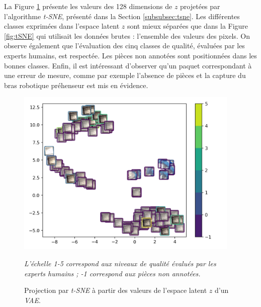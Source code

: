 La Figure \ref{fig:tSNE_ae} présente les valeurs des 128 dimensions de $z$ projetées par l'algorithme \textit{t-SNE}, présenté dans la Section \ref{subsubsec:tsne}.
Les différentes classes exprimées dans l'espace latent $z$ sont mieux séparées que dans la Figure \ref{fig:tSNE} qui utilisait les données brutes : l'ensemble des valeurs des pixels.
On observe également que l'évaluation des cinq classes de qualité, évaluées par les experts humains, est respectée.
Les pièces non annotées sont positionnées dans les bonnes classes.
Enfin, il est intéressant d'observer qu'un paquet correspondant à une erreur de mesure, comme par exemple l'absence de pièces et la capture du bras robotique préhenseur est mis en évidence.

\begin{figure}[hbtp]
	\centering
	\includegraphics[width=0.95\textwidth,height=\textheight,keepaspectratio]{../Chap4/Figures/visualize_T-SNE_latent_space.png}
	\caption{Projection par \textit{t-SNE} à partir des valeurs de l'espace latent $z$ d'un \textit{VAE}.}
	\textit{L'échelle 1-5 correspond aux niveaux de qualité évalués par les experts humains ; -1 correspond aux pièces non annotées.}
	\label{fig:tSNE_ae}
\end{figure}


